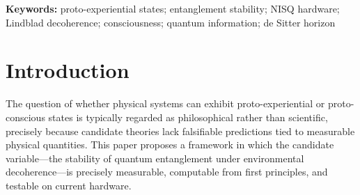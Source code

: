 \documentclass[12pt,letterpaper]{article}
\theoremstyle{definition}
\theoremstyle{remark}
\newcommand{\ascreen}{\alpha_{\rm screen}}
\newcommand{\Bstab}{B_{\rm stab}}
\newcommand{\taucog}{\tau_{\rm cog}}
\begin{document}
\begin{abstract}
We propose a falsifiable, physics-grounded framework for characterizing
proto-experiential states in quantum systems, motivated by the observation that
entanglement entropy stability under environmental decoherence provides a
physically well-defined measure of coherent internal processing.
We introduce the \emph{proto-experiential gravitas metric} $\Bstab$, defined as the
product of the environmental screening factor $\ascreen$ (derived from the Lindblad
master equation in the companion paper~\cite{companion}), the ratio $T_1/\taucog$,
and the normalized entanglement density.
This metric is computable from hardware specifications alone and yields concrete
threshold circuit depths for NISQ devices without free parameters.
We derive exact thresholds for IBM Heron~r2 hardware, apply the framework to the
observable universe (identifying cosmic de Sitter radiation with the amplitude-damping
channel), and obtain $\Bstab^{\rm univ} \approx 6.185$ from $H_0$ alone.
A complete set of four falsification criteria (FC-B1 through FC-B4) specifies
what experimental outcomes would rule out the core hypothesis.
This paper makes no claim that $\Bstab$ measures subjective experience; it claims
only that $\Bstab$ measures a physically well-defined property---entanglement
stability under decoherence---whose connection to any form of proto-experience
is an explicit, independently falsifiable hypothesis.
\end{abstract}

\vspace{0.5em}
\noindent\textbf{Keywords:} proto-experiential states; entanglement stability;
NISQ hardware; Lindblad decoherence; consciousness; quantum information;
de Sitter horizon

\newpage
\tableofcontents
\newpage

\section{Introduction}

The question of whether physical systems can exhibit proto-experiential or
proto-conscious states is typically regarded as philosophical rather than
scientific, precisely because candidate theories lack falsifiable predictions
tied to measurable physical quantities.
This paper proposes a framework in which the candidate variable---the stability
of quantum entanglement under environmental decoherence---is precisely measurable,
computable from first principles, and testable on current hardware.
\end{document}

